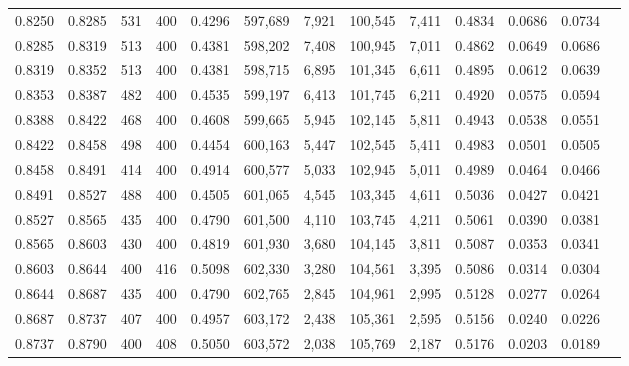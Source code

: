 \begin{tabular}{rrrrrrrrrrrrr}
0.8250 & 0.8285 &    531 & 400 &                                     0.4296 & 597,689 &   7,921 & 100,545 &   7,411 & 0.4834 & 0.0686 & 0.0734 \\
0.8285 & 0.8319 &    513 & 400 &                                     0.4381 & 598,202 &   7,408 & 100,945 &   7,011 & 0.4862 & 0.0649 & 0.0686 \\
0.8319 & 0.8352 &    513 & 400 &                                     0.4381 & 598,715 &   6,895 & 101,345 &   6,611 & 0.4895 & 0.0612 & 0.0639 \\
0.8353 & 0.8387 &    482 & 400 &                                     0.4535 & 599,197 &   6,413 & 101,745 &   6,211 & 0.4920 & 0.0575 & 0.0594 \\
0.8388 & 0.8422 &    468 & 400 &                                     0.4608 & 599,665 &   5,945 & 102,145 &   5,811 & 0.4943 & 0.0538 & 0.0551 \\
0.8422 & 0.8458 &    498 & 400 &                                     0.4454 & 600,163 &   5,447 & 102,545 &   5,411 & 0.4983 & 0.0501 & 0.0505 \\
0.8458 & 0.8491 &    414 & 400 &                                     0.4914 & 600,577 &   5,033 & 102,945 &   5,011 & 0.4989 & 0.0464 & 0.0466 \\
0.8491 & 0.8527 &    488 & 400 &                                     0.4505 & 601,065 &   4,545 & 103,345 &   4,611 & 0.5036 & 0.0427 & 0.0421 \\
0.8527 & 0.8565 &    435 & 400 &                                     0.4790 & 601,500 &   4,110 & 103,745 &   4,211 & 0.5061 & 0.0390 & 0.0381 \\
0.8565 & 0.8603 &    430 & 400 &                                     0.4819 & 601,930 &   3,680 & 104,145 &   3,811 & 0.5087 & 0.0353 & 0.0341 \\
0.8603 & 0.8644 &    400 & 416 &                                     0.5098 & 602,330 &   3,280 & 104,561 &   3,395 & 0.5086 & 0.0314 & 0.0304 \\
0.8644 & 0.8687 &    435 & 400 &                                     0.4790 & 602,765 &   2,845 & 104,961 &   2,995 & 0.5128 & 0.0277 & 0.0264 \\
0.8687 & 0.8737 &    407 & 400 &                                     0.4957 & 603,172 &   2,438 & 105,361 &   2,595 & 0.5156 & 0.0240 & 0.0226 \\
0.8737 & 0.8790 &    400 & 408 &                                     0.5050 & 603,572 &   2,038 & 105,769 &   2,187 & 0.5176 & 0.0203 & 0.0189 \\

\end{tabular}
